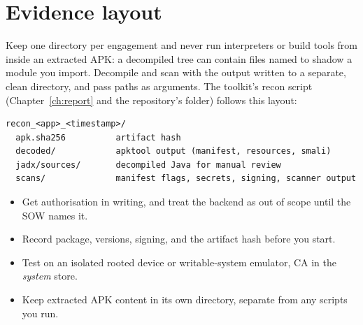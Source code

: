 \section{Evidence layout}
Keep one directory per engagement and never run interpreters or build tools from inside an extracted APK: a decompiled tree can contain files named to shadow a module you import. Decompile and scan with the output written to a separate, clean directory, and pass paths as arguments. The toolkit's recon script (Chapter~\ref{ch:report} and the repository's  folder) follows this layout:

\begin{lstlisting}
recon_<app>_<timestamp>/
  apk.sha256          artifact hash
  decoded/            apktool output (manifest, resources, smali)
  jadx/sources/       decompiled Java for manual review
  scans/              manifest flags, secrets, signing, scanner output
\end{lstlisting}

\begin{summarybox}
\begin{itemize}
\item Get authorisation in writing, and treat the backend as out of scope until the SOW names it.
\item Record package, versions, signing, and the artifact hash before you start.
\item Test on an isolated rooted device or writable-system emulator, CA in the \emph{system} store.
\item Keep extracted APK content in its own directory, separate from any scripts you run.
\end{itemize}
\end{summarybox}
